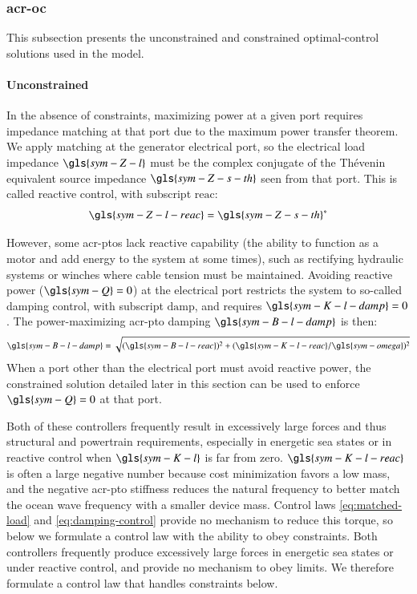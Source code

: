 \subsubsection{\gls{acr-oc}}\label{sec:optimal-control}
This subsection presents the unconstrained and constrained optimal-control solutions used in the model.
\paragraph{Unconstrained}
In the absence of constraints, maximizing power at a given port requires impedance matching at that port due to the maximum power transfer theorem.
We apply matching at the generator electrical port, so the electrical load impedance $\gls{sym-Z-l}$ must be the complex conjugate of the Th\'{e}venin equivalent source impedance $\gls{sym-Z-s-th}$ seen from that port.
This is called reactive control, with subscript $\text{reac}$:
\begin{equation}\label{eq:matched-load}
    \gls{sym-Z-l-reac} = \gls{sym-Z-s-th}^*
\end{equation}

However, some \glspl{acr-pto} lack reactive capability (the ability to function as a motor and add energy to the system at some times), such as rectifying hydraulic systems or winches where cable tension must be maintained.
Avoiding reactive power ($\gls{sym-Q}=0$) at the electrical port restricts the system to so-called damping control, with subscript $\text{damp}$, and requires $\gls{sym-K-l-damp}=0$.
The power-maximizing \gls{acr-pto} damping $\gls{sym-B-l-damp}$ is then:
\begin{equation}\label{eq:damping-control}
    \gls{sym-B-l-damp} = \sqrt{ (\gls{sym-B-l-reac})^2 + (\gls{sym-K-l-reac}/\gls{sym-omega})^2}
\end{equation}
\ifdefined\DISSERTATION
    When a port other than the electrical port must avoid reactive power, the constrained solution detailed later in this section can be used to enforce $\gls{sym-Q}=0$ at that port.

    Both of these controllers frequently result in excessively large forces and thus structural and powertrain requirements, especially in energetic sea states or in reactive control when $\gls{sym-K-l}$ is far from zero.
    $\gls{sym-K-l-reac}$ is often a large negative number because cost minimization favors a low mass, and the negative \gls{acr-pto} stiffness reduces the natural frequency to better match the ocean wave frequency with a smaller device mass.
    Control laws \eqref{eq:matched-load} and \eqref{eq:damping-control} provide no mechanism to reduce this torque, so below we formulate a control law with the ability to obey constraints.
\else
    Both controllers frequently produce excessively large forces in energetic sea states or under reactive control, and provide no mechanism to obey limits.
    We therefore formulate a control law that handles constraints below.
\fi

